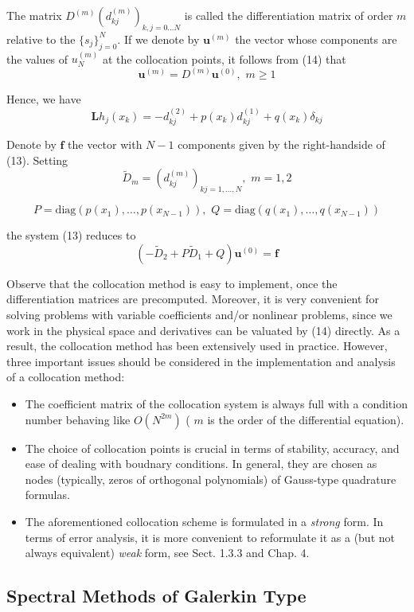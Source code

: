 The matrix $ D^{ (m) } \left( d_{ kj }^{ (m) } \right)_{ k,j=0 \ldots N } $ is called the differentiation matrix of order $ m $ relative to the $ \{ s_{ j } \}_{ j=0 }^{ N } $. If we denote by $ \mathbf{ u }^{ (m) } $ the vector whose components are the values of $ u_{ N }^{ (m) } $ at the collocation points, it follows from (14) that 
\begin{equation}
	\mathbf{ u }^{ (m) } = D^{ (m) } \mathbf{ u }^{ (0) }, \hspace{4pt} m \geq 1
\end{equation}

Hence, we have
\begin{equation}
	\mathbf{ L } h_{ j } \left( x_{ k } \right) = - d^{ (2) }_{ kj } + p(x_{ k }) d^{ (1) }_{ kj } + q\left( x_{ k } \right) \delta_{ kj }
\end{equation}

Denote by $ \mathbf{ f } $ the vector with $ N-1 $ components given by the right-handside of (13). Setting
\begin{equation}
	\tilde{D}_{ m } = \left( d_{ kj }^{ (m) } \right)_{ kj=1,\ldots,N }, \hspace{4pt} m=1,2
\end{equation}

\[
	P = \mathrm{diag} \left( p(x_{ 1 }), \ldots, p(x_{ N-1 }) \right), \hspace{4pt} Q = \mathrm{ diag } \left( q(x_{ 1 }), \ldots, q(x_{ N-1 }) \right)
\]

the system (13) reduces to
\begin{equation}
	\left( - \tilde{D}_{ 2 } + P \tilde{D}_{ 1 } + Q \right) \mathbf{ u }^{ (0) } = \mathbf{ f }
\end{equation}

Observe that the collocation method is easy to implement, once the differentiation matrices are precomputed. Moreover, it is very convenient for solving problems with variable coefficients and/or nonlinear problems, since we work in the physical space and derivatives can be valuated by (14) directly. As a result, the collocation method has been extensively used in practice. However, three important issues should be considered in the implementation and analysis of a collocation method:

\begin{itemize}
	\item The coefficient matrix of the collocation system is always full with a condition number behaving like $ O\left( N^{ 2m } \right) $ ( $ m $ is the order of the differential equation).
	\item The choice of collocation points is crucial in terms of stability, accuracy, and ease of dealing with boudnary conditions. In general, they are chosen as nodes (typically, zeros of orthogonal polynomials) of Gauss-type quadrature formulas.
	\item The aforementioned collocation scheme is formulated in a \textit{strong} form. In terms of error analysis, it is more convenient to reformulate it as a (but not always equivalent) \textit{weak} form, see Sect. 1.3.3 and Chap. 4.
\end{itemize}


\subsection{Spectral Methods of Galerkin Type}

